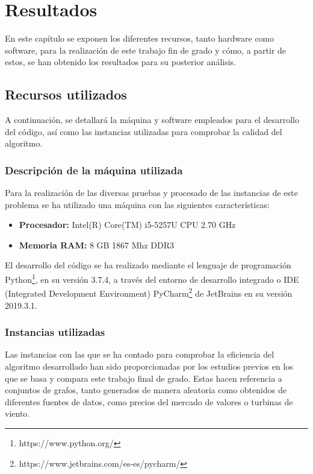 
\chapter{Resultados} %

\label{Chapter5} %


En este capítulo se exponen los diferentes recursos, tanto hardware como software, para la realización de este trabajo fin de grado y cómo, a partir de estos, se han obtenido los resultados para su posterior análisis.

\section{Recursos utilizados}
A continuación, se detallará la máquina y software empleados para el desarrollo del código, así como las instancias utilizadas para comprobar la calidad del algoritmo.

\subsection{Descripción de la máquina utilizada}
\label{sec:maquina}
Para la realización de las diversas pruebas y procesado de las instancias de este problema se ha utilizado una máquina con las siguientes características:

\begin{itemize}

\item \textbf{Procesador:} Intel(R) Core(TM) i5-5257U CPU 2.70 GHz
\item \textbf{Memoria RAM:} 8 GB 1867 Mhz DDR3
\end{itemize}

El desarrollo del código se ha realizado mediante el lenguaje de programación Python\footnote{https://www.python.org/}, en su versión 3.7.4, a través del entorno de desarrollo integrado o \gls{IDE} (Integrated Development Environment) PyCharm\footnote{https://www.jetbrains.com/es-es/pycharm/} de JetBrains en su versión 2019.3.1.

\subsection{Instancias utilizadas}
\label{sec:Instancias-utilizadas}
Las instancias con las que se ha contado para comprobar la eficiencia del algoritmo desarrollado han sido proporcionadas por los estudios previos en los que se basa y compara este trabajo final de grado. Estas hacen referencia a conjuntos de grafos, tanto generados de manera aleatoria como obtenidos de diferentes fuentes de datos, como precios del mercado de valores o turbinas de viento.

